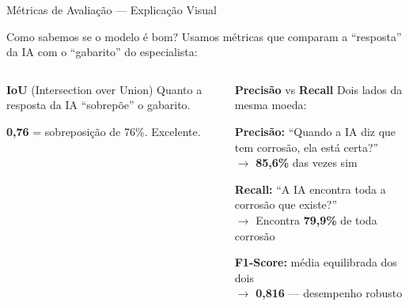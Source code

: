 \documentclass[aspectratio=169, 12pt]{beamer}
\begin{document}
\begin{frame}{Métricas de Avaliação --- Explicação Visual}
    \begin{block}{Como sabemos se o modelo é bom?}
        Usamos métricas que comparam a ``resposta'' da IA com o ``gabarito'' do especialista:
    \end{block}

    \vspace{0.3cm}

    \begin{columns}[T]
        \begin{block}{\textbf{IoU} (Intersection over Union)}
            {\small Quanto a resposta da IA ``sobrepõe'' o gabarito.}

            \begin{center}
            \end{center}

            {\scriptsize \textbf{0,76} = sobreposição de 76\%. Excelente.}
        \end{block}

        \begin{block}{\textbf{Precisão} vs \textbf{Recall}}
            {\small Dois lados da mesma moeda:}

            \vspace{0.2cm}

            \textbf{Precisão:} ``Quando a IA diz que tem corrosão, ela está certa?''\\
            {\scriptsize $\rightarrow$ \textbf{85,6\%} das vezes sim}

            \vspace{0.3cm}

            \textbf{Recall:} ``A IA encontra toda a corrosão que existe?''\\
            {\scriptsize $\rightarrow$ Encontra \textbf{79,9\%} de toda corrosão}

            \vspace{0.3cm}

            \textbf{F1-Score:} média equilibrada dos dois\\
            {\scriptsize $\rightarrow$ \textbf{0,816} --- desempenho robusto}
        \end{block}
    \end{columns}
\end{frame}
\end{document}

